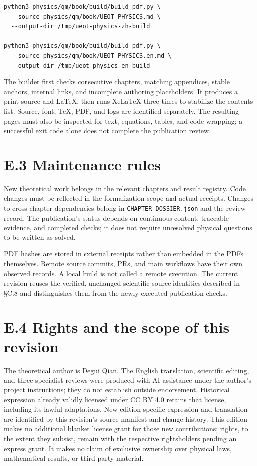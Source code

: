 \documentclass[
  11pt,
  oneside]{book}
\begin{document}
\begin{Verbatim}[breaklines,breakanywhere,fontsize=\scriptsize]
python3 physics/qm/book/build/build_pdf.py \
  --source physics/qm/book/UEOT_PHYSICS.md \
  --output-dir /tmp/ueot-physics-zh-build

python3 physics/qm/book/build/build_pdf.py \
  --source physics/qm/book/UEOT_PHYSICS.en.md \
  --output-dir /tmp/ueot-physics-en-build
\end{Verbatim}

The builder first checks consecutive chapters, matching appendices,
stable anchors, internal links, and incomplete authoring placeholders.
It produces a print source and LaTeX, then runs XeLaTeX three times to
stabilize the contents list. Source, font, TeX, PDF, and logs are
identified separately. The resulting pages must also be inspected for
text, equations, tables, and code wrapping; a successful exit code alone
does not complete the publication review.

\section{E.3 Maintenance rules}

New theoretical work belongs in the relevant chapters and result
registry. Code changes must be reflected in the formalization scope and
actual receipts. Changes to cross-chapter dependencies belong in
\texttt{CHAPTER\_\allowbreak DOSSIER.\allowbreak json} and the review record. The publication's
status depends on continuous content, traceable evidence, and completed
checks; it does not require unresolved physical questions to be written
as solved.

PDF hashes are stored in external receipts rather than embedded in the
PDFs themselves. Remote source commits, PRs, and main workflows have
their own observed records. A local build is not called a remote
execution. The current revision reuses the verified, unchanged
scientific-source identities described in §C.8 and distinguishes them
from the newly executed publication checks.

\section{E.4 Rights and the scope of this revision}

The theoretical author is Degui Qian. The English translation,
scientific editing, and three specialist reviews were produced with AI
assistance under the author's project instructions; they do not
establish outside endorsement. Historical expression already validly
licensed under CC BY 4.0 retains that license, including its lawful
adaptations. New edition-specific expression and translation are
identified by this revision's source manifest and change history. This
edition makes no additional blanket license grant for those new
contributions; rights, to the extent they subsist, remain with the
respective rightsholders pending an express grant. It makes no claim of
exclusive ownership over physical laws, mathematical results, or
third-party material.
\end{document}
